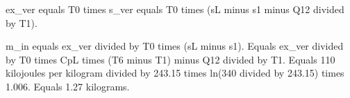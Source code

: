 ex_ver equals T0 times s_ver equals T0 times (sL minus s1 minus Q12 divided by T1).  

m_in equals ex_ver divided by T0 times (sL minus s1).  
Equals ex_ver divided by T0 times CpL times (T6 minus T1) minus Q12 divided by T1.  
Equals 110 kilojoules per kilogram divided by 243.15 times ln(340 divided by 243.15) times 1.006.  
Equals 1.27 kilograms.